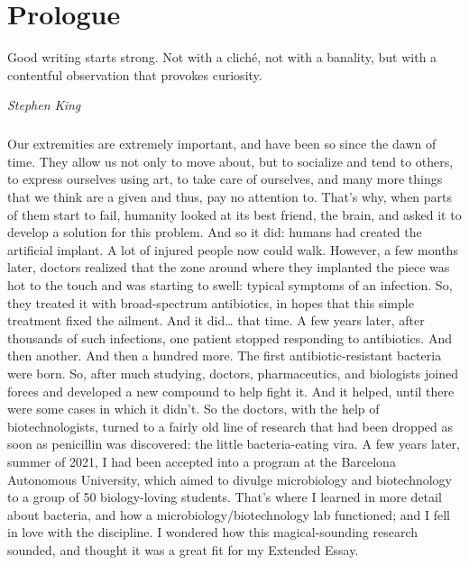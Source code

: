 \chapter{Prologue}
\epigraph{Good writing starts strong. Not with a cliché, not with a banality, but with a contentful observation that provokes curiosity.}{\textit{Stephen King}}
\paragraph{}Our extremities are extremely important, and have been so since the dawn of time. They allow us not only to move about, but to socialize and tend to others, to express ourselves using art, to take care of ourselves, and many more things that we think are a given and thus, pay no attention to. That's why, when parts  of them start to fail, humanity looked at its best friend, the brain, and asked it to develop a solution for this problem. And so it did: humans had created the artificial implant. A lot of injured people now could walk. However, a few months later, doctors realized that the zone around where they implanted the piece was hot to the touch and was starting to swell: typical symptoms of an infection. So, they treated it with broad-spectrum antibiotics, in hopes that this simple treatment fixed the ailment. And it did… that time. A few years later, after thousands of such infections, one patient stopped responding to antibiotics. And then another. And then a hundred more. The first antibiotic-resistant bacteria were born. So, after much studying, doctors, pharmaceutics, and biologists joined forces and developed a new compound to help fight it. And it helped, until there were some cases in which it didn't. So the doctors, with the help of biotechnologists, turned to a fairly old line of research that had been dropped as soon as penicillin was discovered: the little bacteria-eating vira.\newline
A few years later, summer of 2021, I had been accepted into a program at the Barcelona Autonomous University, which aimed to divulge microbiology and biotechnology to a group of 50 biology-loving students. That's where I learned in more detail about bacteria, and how a microbiology/biotechnology lab functioned; and I fell in love with the discipline. I wondered how this magical-sounding research sounded, and thought it was a great fit for my Extended Essay.

